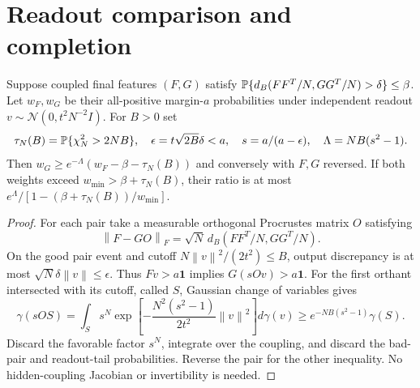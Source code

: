 \documentclass[11pt]{article}
\newcommand{\norm}[1]{\left\lVert#1\right\rVert}
\newcommand{\cN}{\mathcal N}\newcommand{\one}{\mathbf 1}
\begin{document}
\section{Readout comparison and completion}
\begin{lemma}\label{lem:readout}
Suppose coupled final features $(F,G)$ satisfy
$\mathbb P\{d_B(FF^T/N,GG^T/N)>\delta\}\le\beta$. Let $w_F,w_G$ be their all-positive margin-$a$ probabilities under independent readout $v\sim\cN(0,t^2N^{-2}I)$. For $B>0$ set
\[
 \tau_N(B)=\mathbb P\{\chi_N^2>2NB\},\quad\epsilon=t\sqrt{2B}\delta<a,
 \quad s=a/(a-\epsilon),\quad\Lambda=NB(s^2-1).
\]
Then $w_G\ge e^{-\Lambda}(w_F-\beta-\tau_N(B))$ and conversely with $F,G$ reversed. If both weights exceed $w_{\min}>\beta+\tau_N(B)$, their ratio is at most
$e^\Lambda/[1-(\beta+\tau_N(B))/w_{\min}]$.
\end{lemma}
\begin{proof}
For each pair take a measurable orthogonal Procrustes matrix $O$ satisfying
\[\norm{F-GO}_F=\sqrt N\,d_B(FF^T/N,GG^T/N).\] On the good pair event and cutoff $N\norm v^2/(2t^2)\le B$, output discrepancy is at most $\sqrt N\delta\norm v\le\epsilon$. Thus $Fv>a\one$ implies $G(sOv)>a\one$. For the first orthant intersected with its cutoff, called $S$, Gaussian change of variables gives
\[
 \gamma(sOS)=\int_S s^N\exp\!\left[-\frac{N^2(s^2-1)}{2t^2}\norm v^2\right]d\gamma(v)
 \ge e^{-NB(s^2-1)}\gamma(S).
\]
Discard the favorable factor $s^N$, integrate over the coupling, and discard the bad-pair and readout-tail probabilities. Reverse the pair for the other inequality. No hidden-coupling Jacobian or invertibility is needed.
\end{proof}
\end{document}
